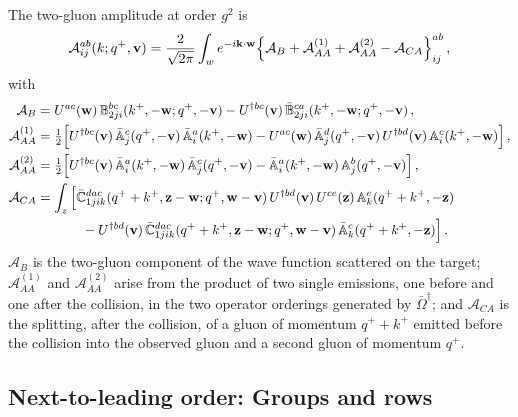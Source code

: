 The two-gluon amplitude at order $g^2$ is
\begin{align}\label{eq:A2gamp}
\mathcal A^{ab}_{ij}(k;q^+,\mathbf{v})=\frac{2}{\sqrt{2\pi}}\int_w e^{-i\mathbf{k}\cdot\mathbf{w}}\Big\{\mathcal A_B+\mathcal A^{(1)}_{AA}+\mathcal A^{(2)}_{AA}-\mathcal A_{CA}\Big\}^{ab}_{ij}\,,
\end{align}
with
\begin{align}
\mathcal A_B&=U^{ac}(\mathbf{w})\,\mathbb{B}^{bc}_{2ji}(k^+,-\mathbf{w};q^+,-\mathbf{v})-U^{\dagger bc}(\mathbf{v})\,\bar{\mathbb{B}}^{ca}_{2ji}(k^+,-\mathbf{w};q^+,-\mathbf{v})\,,
\notag\\
\mathcal A^{(1)}_{AA}&=\tfrac12\Big[U^{\dagger bc}(\mathbf{v})\,\bar{\mathbb{A}}^c_j(q^+,-\mathbf{v})\,\bar{\mathbb{A}}^a_i(k^+,-\mathbf{w})-U^{ac}(\mathbf{w})\,\bar{\mathbb{A}}^d_j(q^+,-\mathbf{v})\,U^{\dagger bd}(\mathbf{v})\,\mathbb{A}^c_i(k^+,-\mathbf{w})\Big]\,,
\notag\\
\mathcal A^{(2)}_{AA}&=\tfrac12\Big[U^{\dagger bc}(\mathbf{v})\,\bar{\mathbb{A}}^a_i(k^+,-\mathbf{w})\,\bar{\mathbb{A}}^c_j(q^+,-\mathbf{v})-\bar{\mathbb{A}}^a_i(k^+,-\mathbf{w})\,\mathbb{A}^b_j(q^+,-\mathbf{v})\Big]\,,
\notag\\
\mathcal A_{CA}&=\int_z\Big[\bar{\mathbb{C}}^{dac}_{1jik}(q^++k^+,\mathbf{z}-\mathbf{w};q^+,\mathbf{w}-\mathbf{v})\,U^{\dagger bd}(\mathbf{v})\,U^{ce}(\mathbf{z})\,\mathbb{A}^e_k(q^++k^+,-\mathbf{z})
\notag\\&\hspace{1.2cm}
-U^{\dagger bd}(\mathbf{v})\,\bar{\mathbb{C}}^{dac}_{1jik}(q^++k^+,\mathbf{z}-\mathbf{w};q^+,\mathbf{w}-\mathbf{v})\,\bar{\mathbb{A}}^c_k(q^++k^+,-\mathbf{z})\Big]\,.
\end{align}
$\mathcal A_B$ is the two-gluon component of the wave function scattered on the target; $\mathcal A^{(1)}_{AA}$ and $\mathcal A^{(2)}_{AA}$ arise from the product of two single emissions, one before and one after the collision, in the two operator orderings generated by $\bar\Omega^\dagger$; and $\mathcal A_{CA}$ is the splitting, after the collision, of a gluon of momentum $q^++k^+$ emitted before the collision into the observed gluon and a second gluon of momentum $q^+$.

\subsection{Next-to-leading order: Groups and rows}\label{sec:groups}

